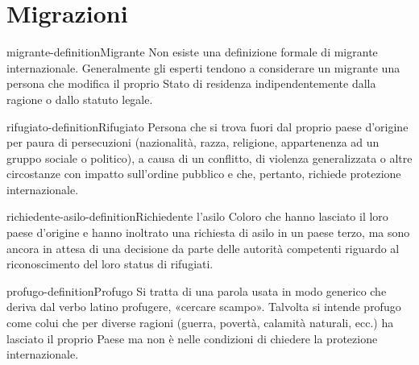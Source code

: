 \documentclass[preview]{standalone}
\begin{document}
\genpage

\section{Migrazioni}

\begin{snippetdefinition}{migrante-definition}{Migrante}
    Non esiste una definizione formale di migrante internazionale. Generalmente gli esperti tendono a considerare un migrante una persona che
    modifica il proprio Stato di residenza indipendentemente dalla ragione
    o dallo statuto legale.
\end{snippetdefinition}

\begin{snippetdefinition}{rifugiato-definition}{Rifugiato}
    Persona che si trova fuori dal proprio paese d'origine per paura di persecuzioni
    (nazionalità, razza, religione, appartenenza ad un gruppo sociale o politico),
    a causa di un conflitto, di violenza generalizzata o altre
    circostanze con impatto sull'ordine pubblico e che, pertanto, richiede
    protezione internazionale.
\end{snippetdefinition}

\begin{snippetdefinition}{richiedente-asilo-definition}{Richiedente l'asilo}
    Coloro che hanno lasciato il loro paese d'origine e hanno inoltrato una
    richiesta di asilo in un paese terzo, ma sono ancora in attesa di una
    decisione da parte delle autorità competenti riguardo al riconoscimento
    del loro status di rifugiati.
\end{snippetdefinition}

\begin{snippetdefinition}{profugo-definition}{Profugo}
    Si tratta di una parola usata in modo generico che deriva dal verbo latino
    profugere, «cercare scampo». Talvolta si intende profugo come
    colui che per diverse ragioni (guerra, povertà, calamità naturali, ecc.) ha
    lasciato il proprio Paese ma non è nelle condizioni di chiedere la protezione internazionale.
\end{snippetdefinition}

\newcommand{\greenbox}{
    \fcolorbox{black}{green}{\rule{0pt}{5pt}\rule{5pt}{0pt}}
}

\newcommand{\redbox}{
    \fcolorbox{black}{red}{\rule{0pt}{5pt}\rule{5pt}{0pt}}
}
\end{document}
